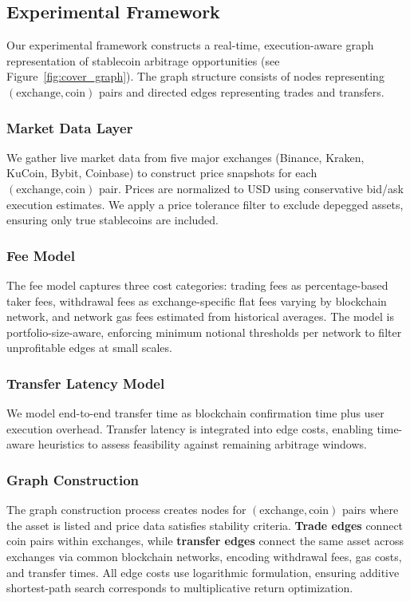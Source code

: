 \subsection{Experimental Framework}

Our experimental framework constructs a real-time, execution-aware graph representation of stablecoin arbitrage opportunities (see Figure~\ref{fig:cover_graph}). The graph structure consists of nodes representing $(\text{exchange}, \text{coin})$ pairs and directed edges representing trades and transfers.

\subsubsection{Market Data Layer}

We gather live market data from five major exchanges (Binance, Kraken, KuCoin, Bybit, Coinbase) to construct price snapshots for each $(\text{exchange}, \text{coin})$ pair. Prices are normalized to USD using conservative bid/ask execution estimates. We apply a price tolerance filter to exclude depegged assets, ensuring only true stablecoins are included.

\subsubsection{Fee Model}

The fee model captures three cost categories: trading fees as percentage-based taker fees, withdrawal fees as exchange-specific flat fees varying by blockchain network, and network gas fees estimated from historical averages. The model is portfolio-size-aware, enforcing minimum notional thresholds per network to filter unprofitable edges at small scales.

\subsubsection{Transfer Latency Model}

We model end-to-end transfer time as blockchain confirmation time plus user execution overhead. Transfer latency is integrated into edge costs, enabling time-aware heuristics to assess feasibility against remaining arbitrage windows.

\subsubsection{Graph Construction}

The graph construction process creates nodes for $(\text{exchange}, \text{coin})$ pairs where the asset is listed and price data satisfies stability criteria. \textbf{Trade edges} connect coin pairs within exchanges, while \textbf{transfer edges} connect the same asset across exchanges via common blockchain networks, encoding withdrawal fees, gas costs, and transfer times. All edge costs use logarithmic formulation, ensuring additive shortest-path search corresponds to multiplicative return optimization.

